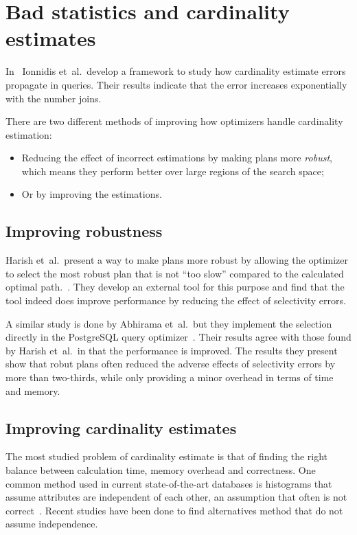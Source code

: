 \section{Bad statistics and cardinality estimates}
In~\cite{ioannidis_1991_propagation_otpoeitsojr} Ionnidis  et\ al.\ develop a
framework to study how cardinality estimate errors propagate in queries. Their
results indicate that the error increases exponentially with the number joins.

There are two different methods of improving how optimizers handle cardinality
estimation:
\begin{itemize}
\item Reducing the effect of incorrect estimations by making plans more
  \textit{robust}, which means they perform better over large regions of the
  search space;
\item Or by improving the estimations.
\end{itemize}

\subsection{Improving robustness}
Harish et\ al.\ present a way to make plans more robust by allowing the
optimizer to select the most robust plan that is not ``too slow'' compared to
the calculated optimal path.~\cite{harish_2008_identifying_irptpdr}. They
develop an external tool for this purpose and find that the tool indeed does
improve performance by reducing the effect of selectivity errors.

A similar study is done by Abhirama et\ al.\ but they implement the selection
directly in the PostgreSQL query
optimizer~\cite{abhirama_2010_stability_otsopcatcops}. Their results agree with
those found by Harish  et\ al.\ in that the performance is improved. The results
they present show that robut plans often reduced the adverse effects of
selectivity errors by more than two-thirds, while only providing a minor overhead in
terms of time and memory.

\subsection{Improving cardinality estimates}\label{sec:improving_cardinality_estimates}
The most studied problem of cardinality estimate is that of finding the right
balance between calculation time, memory overhead and correctness. One common
method used in current state-of-the-art databases is histograms that assume
attributes are independent of each other, an assumption that often is not
correct~\cite{ioannidis_2003_history_thoha}. Recent studies have been done to
find alternatives method that do not assume independence.

